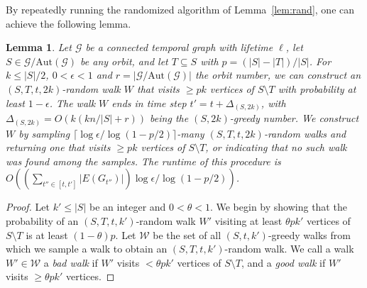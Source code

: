 \documentclass[10pt,a4paper]{article}
\newtheorem{lemma}{Lemma}[section]
\newcommand{\auttg}{\ensuremath{\text{Aut}(\mathcal{G})}}
\newcommand{\torb}{\ensuremath{\mathcal{G}/\auttg}}
\begin{document}
{    By repeatedly running the randomized algorithm of Lemma~\ref{lem:rand}, one can
achieve the following lemma. 
{
\begin{lemma}\label{lem:randlog} Let $\mathcal{G}$ be a connected temporal
    graph with lifetime $\ell$, let $S \in \torb$ be any orbit, and let $T
    \subseteq S$ with $p=(|S|-|T|)/|S|$. For $k \leq |S|/2$,  $0 < \epsilon < 1$ and
    $r=|\torb|$ the orbit number, we
    can construct an $(S, T, t, 2k)$-random walk $W$ that visits $\geq p k$
    vertices of $S \setminus T$ with probability at least $1-\epsilon$. 
    The walk $W$ ends in time step $t'=t+\Delta_{(S, 2k)}$, with
    $\Delta_{(S, 2k)}=O(k(k n/|S|+r))$ being the $(S, 2k)$-greedy number.
    We construct $W$ by 
    sampling %
    {$\lceil \log\epsilon/\log(1-p/2) \rceil$-many
    $(S, T, t, 2k)$-random walks
    and returning one
    that visits $\geq pk$ vertices of $S\setminus T$, or indicating
    that no such walk was found among the samples}.
    The runtime of this procedure is $O((\sum_{t'' \in [t, t']}|E(G_{t''})|)
\log \epsilon/\log(1-p/2))$. 
\end{lemma}
\begin{proof}
    Let $k' \leq |S|$ be an integer and $0 < \theta < 1$.
    We begin by showing that the
    probability of an $(S, T, t, k')$-random walk $W'$ visiting at least $\theta
    pk'$ vertices of $S\setminus T$ is at least $(1-\theta)p$. 
    Let $\mathcal{W}$ be the set of all $(S, t, k')$-greedy walks
    from which we
    sample a walk to obtain an $(S, T, t, k')$-random walk. We call a walk $W'
    \in \mathcal{W}$ a \emph{bad walk} if $W'$ visits $< \theta p k'$ vertices
    of $S\setminus T$, and a \emph{good walk} if $W'$ visits $\geq \theta p k'$
    vertices. 


\end{proof}}}
\end{document}
